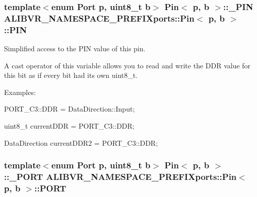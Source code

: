 \subsubsection[{\texorpdfstring{P\+IN}{PIN}}]{\setlength{\rightskip}{0pt plus 5cm}template$<$enum Port p, uint8\+\_\+t b$>$ {\bf Pin}$<$ p, b $>$\+::{\bf \+\_\+\+P\+IN} {\bf A\+L\+I\+B\+V\+R\+\_\+\+N\+A\+M\+E\+S\+P\+A\+C\+E\+\_\+\+P\+R\+E\+F\+I\+Xports\+::\+Pin}$<$ p, b $>$\+::P\+IN\hspace{0.3cm}{\ttfamily [static]}}\hypertarget{structALIBVR__NAMESPACE__PREFIXports_1_1Pin_a76f4ad486feabcd5abf2f3d9afa24650}{}\label{structALIBVR__NAMESPACE__PREFIXports_1_1Pin_a76f4ad486feabcd5abf2f3d9afa24650}


Simplified access to the P\+IN value of this pin. 

A cast operator of this variable allows you to read and write the D\+DR value for this bit as if every bit had its own uint8\+\_\+t.

Examples\+:


\begin{DoxyItemize}
\item {\ttfamily P\+O\+R\+T\+\_\+\+C3\+::\+D\+DR = Data\+Direction\+::\+Input;}
\item {\ttfamily uint8\+\_\+t current\+D\+DR = P\+O\+R\+T\+\_\+\+C3\+::\+D\+DR;}
\item {\ttfamily Data\+Direction current\+D\+D\+R2 = P\+O\+R\+T\+\_\+\+C3\+::\+D\+DR;} 
\end{DoxyItemize}
\subsubsection[{\texorpdfstring{P\+O\+RT}{PORT}}]{\setlength{\rightskip}{0pt plus 5cm}template$<$enum Port p, uint8\+\_\+t b$>$ {\bf Pin}$<$ p, b $>$\+::{\bf \+\_\+\+P\+O\+RT} {\bf A\+L\+I\+B\+V\+R\+\_\+\+N\+A\+M\+E\+S\+P\+A\+C\+E\+\_\+\+P\+R\+E\+F\+I\+Xports\+::\+Pin}$<$ p, b $>$\+::P\+O\+RT\hspace{0.3cm}{\ttfamily [static]}}\hypertarget{structALIBVR__NAMESPACE__PREFIXports_1_1Pin_a0d296d2ad6858263ef7aff31969a0b2d}{}\label{structALIBVR__NAMESPACE__PREFIXports_1_1Pin_a0d296d2ad6858263ef7aff31969a0b2d}


